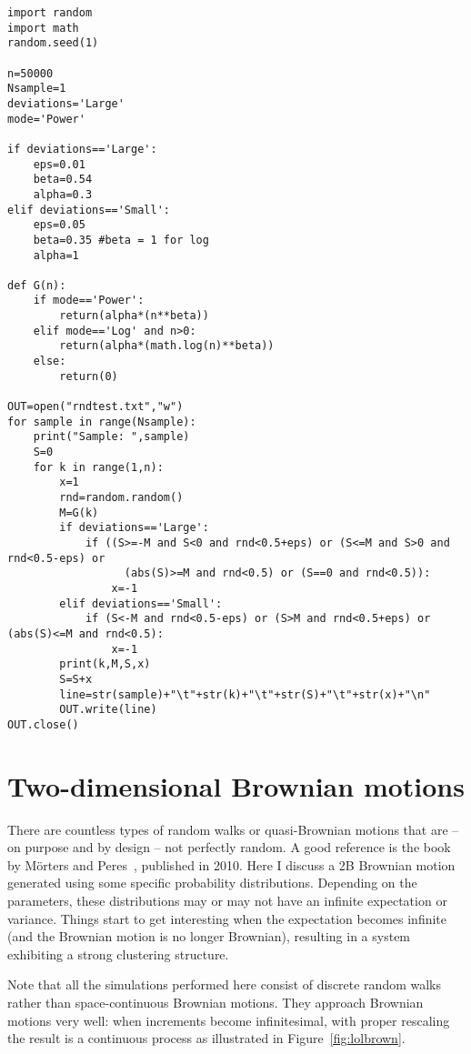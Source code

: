 \documentclass[oneside,10pt]{book}
\begin{document}
\begin{lstlisting}
import random
import math
random.seed(1)

n=50000
Nsample=1
deviations='Large'
mode='Power'

if deviations=='Large':
    eps=0.01
    beta=0.54
    alpha=0.3
elif deviations=='Small':
    eps=0.05
    beta=0.35 #beta = 1 for log
    alpha=1

def G(n):
    if mode=='Power':
        return(alpha*(n**beta))
    elif mode=='Log' and n>0:
        return(alpha*(math.log(n)**beta))
    else:
        return(0)

OUT=open("rndtest.txt","w")
for sample in range(Nsample):
    print("Sample: ",sample)
    S=0
    for k in range(1,n):
        x=1
        rnd=random.random()
        M=G(k)
        if deviations=='Large':
            if ((S>=-M and S<0 and rnd<0.5+eps) or (S<=M and S>0 and rnd<0.5-eps) or
                  (abs(S)>=M and rnd<0.5) or (S==0 and rnd<0.5)):
                x=-1
        elif deviations=='Small':
            if (S<-M and rnd<0.5-eps) or (S>M and rnd<0.5+eps) or (abs(S)<=M and rnd<0.5):
                x=-1
        print(k,M,S,x)
        S=S+x
        line=str(sample)+"\t"+str(k)+"\t"+str(S)+"\t"+str(x)+"\n"
        OUT.write(line)
OUT.close()

\end{lstlisting}


\section{Two-dimensional Brownian motions}



There are countless types of random walks or quasi-Brownian motions that are -- on purpose and by design -- not perfectly random.  A good reference is the book by Mörters and Peres~\cite{peresbrown}, published in 2010. Here I discuss a 2B Brownian motion generated using some specific probability distributions. Depending on the parameters, these distributions may or may not have an infinite expectation or variance. Things start to get interesting when the expectation becomes infinite (and the Brownian motion is no
 longer Brownian), resulting in a system exhibiting a strong clustering structure.

Note that all the simulations performed here consist of discrete random walks rather than
 space-continuous Brownian motions.
 They approach Brownian motions very well: when increments become infinitesimal, with proper rescaling the result is a continuous process
 as illustrated in Figure~\ref{fig:lolbrown}.
\end{document}
